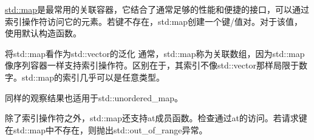 \href{http://en.cppreference.com/w/cpp/container/map}{std::map}是最常用的关联容器，它结合了通常足够的性能和便捷的接口，可以通过索引操作符访问它的元素。若键不存在，std:map创建一个键/值对。对于该值，使用默认构造函数。

\begin{myTip}{将std::map看作为std::vector的泛化}
通常，std::map称为关联数组，因为std::map像序列容器一样支持索引操作符。区别在于，其索引不像std::vector那样局限于数字。std::map的索引几乎可以是任意类型。

同样的观察结果也适用于std::unordered\_map。
\end{myTip}

除了索引操作符之外，std::map还支持at成员函数。检查通过at的访问。若请求键在std::map中不存在，则抛出std::out\_of\_range异常。

















































